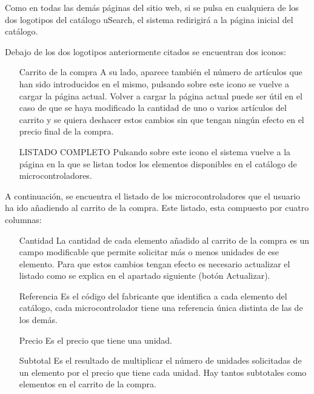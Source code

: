 Como en todas las demás páginas del sitio web, si se pulsa en cualquiera de los dos logotipos del catálogo uSearch,
el sistema redirigirá a la página inicial del catálogo.

Debajo de los dos logotipos anteriormente citados se encuentran dos iconos:

\begin{itemize}
	\item[Carrito de la compra] A su lado, aparece también el número de artículos 
	que han sido introducidos en el mismo, pulsando sobre este icono se vuelve a cargar la página actual. Volver a 				
  cargar la página actual puede ser útil en el caso de que se haya modificado la cantidad de uno o varios artículos 			
  del	carrito y se quiera deshacer estos cambios sin que tengan ningún efecto en el precio final de la compra.

	\item[LISTADO COMPLETO] Pulsando sobre este icono el sistema vuelve a la página en la que se listan todos los
	elementos disponibles en el catálogo de microcontroladores.
\end{itemize}

A continuación, se encuentra el listado de los microcontroladores que el usuario ha ido añadiendo al carrito de la 
compra. Este listado, esta compuesto por cuatro columnas: 
\begin{itemize}
	\item[Cantidad] La cantidad de cada elemento añadido al carrito de la compra es un campo modificable que permite
	solicitar más o menos unidades de ese elemento. Para que estos cambios tengan efecto es necesario actualizar el 
	listado como se explica en el apartado siguiente (botón Actualizar).
	
	\item[Referencia] Es el código del fabricante que identifica a cada elemento del catálogo, cada microcontrolador
	tiene una referencia única distinta de las de los demás.
	
	\item[Precio] Es el precio que tiene una unidad.

	\item[Subtotal] Es el resultado de multiplicar el número de unidades solicitadas de un elemento por el precio que
	tiene cada unidad. Hay tantos subtotales como elementos en el carrito de la compra.
\end{itemize}

